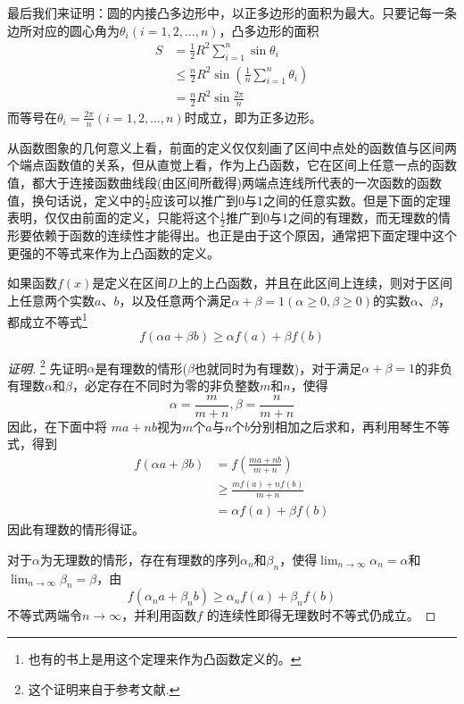 最后我们来证明：圆的内接凸多边形中，以正多边形的面积为最大。只要记每一条边所对应的圆心角为$\theta_i(i=1,2,\ldots,n)$，凸多边形的面积
\begin{align*}
  S &= \frac{1}{2}R^2 \sum_{i=1}^n \sin{\theta_i} \\
& \leqslant \frac{n}{2}R^2 \sin{\left(\frac{1}{n}\sum_{i=1}^n\theta_i\right)} \\
    & =  \frac{n}{2}R^2 \sin{\frac{2\pi}{n}}
\end{align*}
而等号在$\theta_i=\frac{2\pi}{n}(i=1,2,\ldots,n)$时成立，即为正多边形。

从函数图象的几何意义上看，前面的定义仅仅刻画了区间中点处的函数值与区间两个端点函数值的关系，但从直觉上看，作为上凸函数，它在区间上任意一点的函数值，都大于连接函数曲线段(由区间所截得)两端点连线所代表的一次函数的函数值，换句话说，定义中的$\frac{1}{2}$应该可以推广到0与1之间的任意实数。但是下面的定理表明，仅仅由前面的定义，只能将这个$\frac{1}{2}$推广到0与1之间的有理数，而无理数的情形要依赖于函数的连续性才能得出。也正是由于这个原因，通常把下面定理中这个更强的不等式来作为上凸函数的定义。

\begin{theorem}
  \label{theorem:convexity-function-with-weight}
  如果函数$f(x)$是定义在区间$D$上的上凸函数，并且在此区间上连续，则对于区间上任意两个实数$a$、$b$，以及任意两个满足$\alpha + \beta = 1(\alpha \geqslant 0, \beta \geqslant 0)$的实数$\alpha$、$\beta$，都成立不等式\footnote{也有的书上是用这个定理来作为凸函数定义的。}
  \begin{equation}
    \label{eq:convexity-function-with-weight}
    f(\alpha a + \beta b) \geqslant \alpha f(a) + \beta f(b) 
  \end{equation}
\end{theorem}

\begin{proof}[证明]\footnote{这个证明来自于参考文献\cite{the-secret-of-inequality}.}
  先证明$\alpha$是有理数的情形($\beta$也就同时为有理数)，对于满足$\alpha+\beta=1$的非负有理数$\alpha$和$\beta$，必定存在不同时为零的非负整数$m$和$n$，使得
  \begin{equation*}
    \alpha = \frac{m}{m+n}, \beta = \frac{n}{m+n}
  \end{equation*}
因此，在下面中将 $ma+nb$视为$m$个$a$与$n$个$b$分别相加之后求和，再利用琴生不等式，得到
\begin{equation*}
  \begin{split}
    f(\alpha a + \beta b) & = f \left( \frac{ma+nb}{m+n} \right) \\
& \geqslant \frac{mf(a)+nf(b)}{m+n} \\
& = \alpha f(a) + \beta f(b)
  \end{split}
\end{equation*}
因此有理数的情形得证。

对于$\alpha$为无理数的情形，存在有理数的序列$\alpha_n$和$\beta_n$，使得$\lim_{n\to\infty}\alpha_n=\alpha$和$\lim_{n\to\infty}\beta_n=\beta$，由
\begin{equation*}
    f(\alpha_n a + \beta_n b) \geqslant \alpha_n f(a) + \beta_n f(b) 
\end{equation*}
不等式两端令$n\to\infty$，并利用函数$f$ 的连续性即得无理数时不等式仍成立。
\end{proof}


